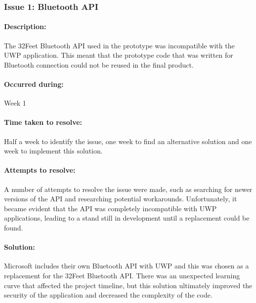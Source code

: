 		\subsubsection{Issue 1: Bluetooth API}{
			\paragraph{Description:}
			The 32Feet Bluetooth API used in the prototype was incompatible with the UWP application. This meant that the prototype code that was written for Bluetooth connection could not be reused in the final product.
				
			\paragraph{Occurred during:}
			Week 1
		
			\paragraph{Time taken to resolve:} Half a week to identify the issue, one week to find an alternative solution and one week to implement this solution.
		
			\paragraph{Attempts to resolve:}
			A number of attempts to resolve the issue were made, such as searching for newer versions of the API and researching potential workarounds. Unfortunately, it became evident that the API was completely incompatible with UWP applications, leading to a stand still in development until a replacement could be found.
			
			\paragraph{Solution:}
			Microsoft includes their own Bluetooth API with UWP and this was chosen as a replacement for the 32Feet Bluetooth API. There was an unexpected learning curve that affected the project timeline, but this solution ultimately improved the security of the application and decreased the complexity of the code.
		}
		\label{ssec:BluetoothAPI}
		
